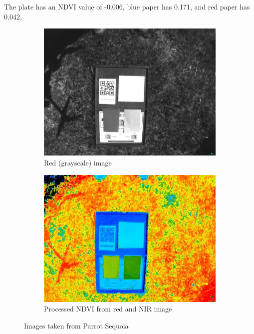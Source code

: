 The plate has an NDVI value of -0.006, blue paper has 0.171, and red paper has 0.042.

\begin{figure}[H]
\begin{subfigure}{0.5\textwidth}
\centering
\includegraphics[scale=0.35]{images/sequoia_redcal.jpg}
\caption{Red (grayscale) image}
\end{subfigure}
\begin{subfigure}{0.5\textwidth}
\centering
\includegraphics[scale=0.35]{images/sequoia_ndvical.jpg}
\caption{Processed NDVI from red and NIR image}
\end{subfigure}
\caption{Images taken from Parrot Sequoia}
\label{fig:cal_plate}
\end{figure}


